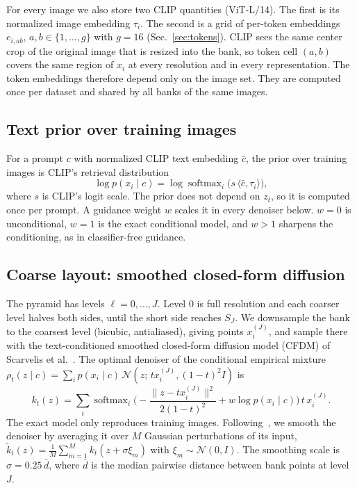 For every image we also store two CLIP quantities (ViT-L/14). The first is its normalized image embedding $\tau_i$. The second is a grid of per-token embeddings $e_{i,ab}$, $a,b\in\{1,\dots,g\}$ with $g=16$ (Sec.~\ref{sec:tokens}). CLIP sees the same center crop of the original image that is resized into the bank, so token cell $(a,b)$ covers the same region of $x_i$ at every resolution and in every representation. The token embeddings therefore depend only on the image set. They are computed once per dataset and shared by all banks of the same images.

\subsection{Text prior over training images}
\label{sec:prior}

For a prompt $c$ with normalized CLIP text embedding $\hat c$, the prior over training images is CLIP's retrieval distribution
\begin{equation}
  \log p(x_i\mid c) = \log\operatorname{softmax}_i\!\big(s\,\langle \hat c,\tau_i\rangle\big),
  \label{eq:prior}
\end{equation}
where $s$ is CLIP's logit scale. The prior does not depend on $z_t$, so it is computed once per prompt. A guidance weight $w$ scales it in every denoiser below. $w=0$ is unconditional, $w=1$ is the exact conditional model, and $w>1$ sharpens the conditioning, as in classifier-free guidance.

\subsection{Coarse layout: smoothed closed-form diffusion}
\label{sec:coarse}

The pyramid has levels $\ell=0,\dots,J$. Level $0$ is full resolution and each coarser level halves both sides, until the short side reaches $S_J$. We downsample the bank to the coarsest level (bicubic, antialiased), giving points $x_i^{(J)}$, and sample there with the text-conditioned smoothed closed-form diffusion model (CFDM) of Scarvelis et al.~\cite{scarvelis2023closed}. The optimal denoiser of the conditional empirical mixture $\rho_t(z\mid c)=\sum_i p(x_i\mid c)\,\mathcal N(z;\,t x_i^{(J)},(1-t)^2 I)$ is
\begin{equation}
  k_t(z) = \sum_i \operatorname{softmax}_i\!\Big(-\frac{\lVert z-t x_i^{(J)}\rVert^2}{2(1-t)^2} + w\log p(x_i\mid c)\Big)\, t\,x_i^{(J)}.
  \label{eq:kt}
\end{equation}
The exact model only reproduces training images. Following~\cite{scarvelis2023closed}, we smooth the denoiser by averaging it over $M$ Gaussian perturbations of its input,
$\tilde k_t(z)=\frac1M\sum_{m=1}^M k_t(z+\sigma\xi_m)$ with $\xi_m\sim\mathcal N(0,I)$. The smoothing scale is $\sigma=0.25\,\bar d$, where $\bar d$ is the median pairwise distance between bank points at level $J$.

